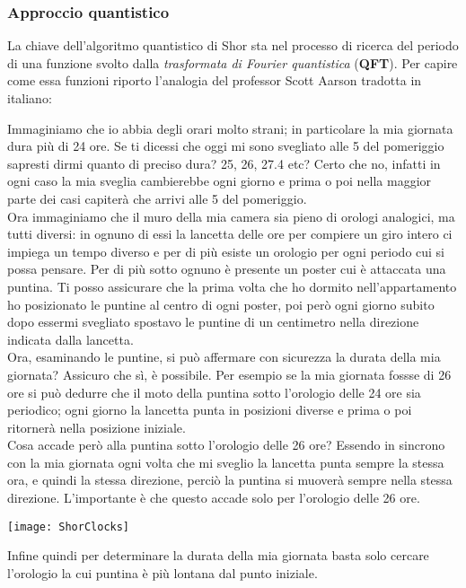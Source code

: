 \subsubsection{Approccio quantistico}
La chiave dell'algoritmo quantistico di Shor sta nel processo di ricerca del periodo di una funzione svolto dalla \textit{trasformata di Fourier quantistica} (\textbf{QFT}). Per capire come essa funzioni riporto l'analogia del professor Scott Aarson tradotta in italiano:
\begin{displayquote}
Immaginiamo che io abbia degli orari molto strani; in particolare la mia giornata dura più di 24 ore. Se ti dicessi che oggi mi sono svegliato alle 5 del pomeriggio sapresti dirmi quanto di preciso dura? 25, 26, 27.4 etc? Certo che no, infatti in ogni caso la mia sveglia cambierebbe ogni giorno e prima o poi nella maggior parte dei casi capiterà che arrivi alle 5 del pomeriggio.\\
Ora immaginiamo che il muro della mia camera sia pieno di orologi analogici, ma tutti diversi: in ognuno di essi la lancetta delle ore per compiere un giro intero ci impiega un tempo diverso e per di più esiste un orologio per ogni periodo cui si possa pensare. Per di più sotto ognuno è presente un poster cui è attaccata una puntina. Ti posso assicurare che la prima volta che ho dormito nell'appartamento ho posizionato le puntine al centro di ogni poster, poi però ogni giorno subito dopo essermi svegliato spostavo le puntine di un centimetro nella direzione indicata dalla lancetta.\\
Ora, esaminando le puntine, si può affermare con sicurezza la durata della mia giornata? Assicuro che sì, è possibile. Per esempio se la mia giornata fossse di 26 ore si può dedurre che il moto della puntina sotto l'orologio delle 24 ore sia periodico; ogni giorno la lancetta punta in posizioni diverse e prima o poi ritornerà nella posizione iniziale.\\
Cosa accade però alla puntina sotto l'orologio delle 26 ore? Essendo in sincrono con la mia giornata ogni volta che mi sveglio la lancetta punta sempre la stessa ora, e quindi la stessa direzione, perciò la puntina si muoverà sempre nella stessa direzione. L'importante è che questo accade solo per l'orologio delle 26 ore.
\begin{center}
\texttt{[image: ShorClocks]}
\end{center}
Infine quindi per determinare la durata della mia giornata basta solo cercare l'orologio la cui puntina è più lontana dal punto iniziale.
\end{displayquote}
